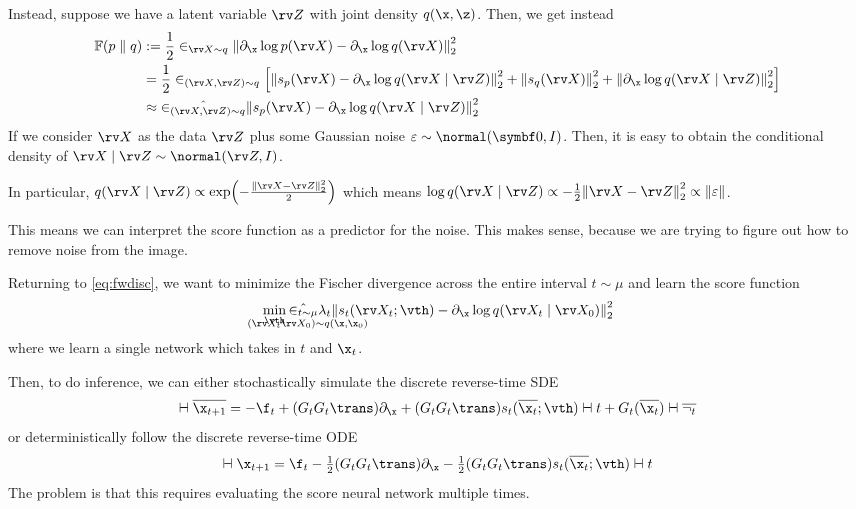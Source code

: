 \documentclass[class=cs480,notes,tikz]{agony}
\begin{document}
Instead, suppose we have a latent variable $\rv Z$ with joint density $q(\x,\z)$.
Then, we get instead
\begin{align*}
  \F(p \parallel q)
   & := \frac12\E_{\rv X \sim q} \norm{\partial_{\x}\log p(\rv X) - \partial_{\x}\log q(\rv X)}_2^2                                                                                    \\
   & = \frac12\E_{(\rv X,\rv Z) \sim q} \qty[\norm{s_p(\rv X) - \partial_{\x}\log q(\rv X \mid \rv Z)}_2^2 + \norm{s_q(\rv X)}^2_2 + \norm{\partial_{\x}\log q(\rv X \mid \rv Z)}_2^2] \\
   & \approx \hat{\E_{(\rv X,\rv Z)\sim q}} \norm{s_p(\rv X) - \partial_{\x}\log q(\rv X \mid \rv Z)}_2^2
\end{align*}
If we consider $\rv X$ as the data $\rv Z$ plus some Gaussian noise $\varepsilon \sim \normal(\symbf0,I)$.
Then, it is easy to obtain the conditional density of $\rv X \mid \rv Z \sim \normal(\rv Z,I)$.

In particular, $q(\rv X \mid \rv Z) \propto \exp(-\frac{\norm{\rv X -\rv Z}_2^2}{2})$
which means $\log q(\rv X \mid \rv Z) \propto -\frac12\norm{\rv X - \rv Z}_2^2 \propto \norm{\varepsilon}$.

This means we can interpret the score function as a predictor for the noise.
This makes sense, because we are trying to figure out how to remove noise from the image.

Returning to \cref{eq:fwdisc}, we want to minimize the Fischer divergence
across the entire interval $t \sim \mu$ and learn the score function
\begin{equation*}\label{eq:scoremodel}
  \min_{\vth} \hat{\E_{\scriptscriptstyle\substack{t \sim \mu \\ \mathclap{(\rv X_t \rv X_0) \sim q(\x,\x_0)}}}}
  \lambda_t \norm{s_t(\rv X_t; \vth) - \partial_{\x}\log q(\rv X_t \mid \rv X_0)}_2^2
\end{equation*}
where we learn a single network which takes in $t$ and $\x_t$.

Then, to do inference, we can either stochastically simulate the discrete reverse-time SDE
\[ \dd{\overline{\x_{t+1}}} = -\f_t + (G_tG_t\trans)\partial_{\x} + (G_tG_t\trans)s_t(\overline{\x_t};\vth) \dd{t} + G_t(\overline{\x_t}) \dd{\overline{\n_t}} \]
or deterministically follow the discrete reverse-time ODE
\[ \dd{\x_{t+1}} = \f_t - \tfrac12(G_tG_t\trans)\partial_{\x} - \tfrac12(G_tG_t\trans)s_t(\overline{\x_t};\vth) \dd{t} \]
The problem is that this requires evaluating the score neural network multiple times.
\end{document}
